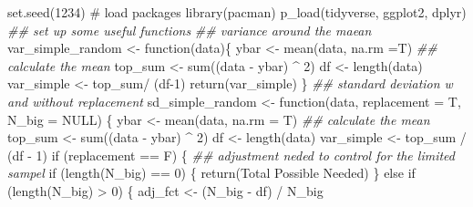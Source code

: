 \documentclass[
  letterpaper,
]{book}
\newenvironment{Shaded}{\begin{snugshade}}{\end{snugshade}}
\newcommand{\AttributeTok}[1]{\textcolor[rgb]{0.40,0.45,0.13}{#1}}
\newcommand{\CommentTok}[1]{\textcolor[rgb]{0.37,0.37,0.37}{#1}}
\newcommand{\ConstantTok}[1]{\textcolor[rgb]{0.56,0.35,0.01}{#1}}
\newcommand{\ControlFlowTok}[1]{\textcolor[rgb]{0.00,0.23,0.31}{#1}}
\newcommand{\DecValTok}[1]{\textcolor[rgb]{0.68,0.00,0.00}{#1}}
\newcommand{\DocumentationTok}[1]{\textcolor[rgb]{0.37,0.37,0.37}{\textit{#1}}}
\newcommand{\FunctionTok}[1]{\textcolor[rgb]{0.28,0.35,0.67}{#1}}
\newcommand{\NormalTok}[1]{\textcolor[rgb]{0.00,0.23,0.31}{#1}}
\newcommand{\OtherTok}[1]{\textcolor[rgb]{0.00,0.23,0.31}{#1}}
\newcommand{\SpecialCharTok}[1]{\textcolor[rgb]{0.37,0.37,0.37}{#1}}
\newcommand{\StringTok}[1]{\textcolor[rgb]{0.13,0.47,0.30}{#1}}
\begin{document}
\begin{Shaded}
\begin{Highlighting}[]
\FunctionTok{set.seed}\NormalTok{(}\DecValTok{1234}\NormalTok{)}
\CommentTok{\# load packages }
\FunctionTok{library}\NormalTok{(pacman)}
\FunctionTok{p\_load}\NormalTok{(tidyverse, ggplot2, dplyr)}
\DocumentationTok{\#\# set up some useful functions }
\DocumentationTok{\#\# variance around the maean }
\NormalTok{var\_simple\_random }\OtherTok{\textless{}{-}} \ControlFlowTok{function}\NormalTok{(data)\{}
\NormalTok{  ybar }\OtherTok{\textless{}{-}} \FunctionTok{mean}\NormalTok{(data, }\AttributeTok{na.rm =}\NormalTok{T) }\DocumentationTok{\#\# calculate the mean}
\NormalTok{  top\_sum }\OtherTok{\textless{}{-}} \FunctionTok{sum}\NormalTok{((data }\SpecialCharTok{{-}}\NormalTok{ ybar) }\SpecialCharTok{\^{}} \DecValTok{2}\NormalTok{)}
\NormalTok{  df }\OtherTok{\textless{}{-}} \FunctionTok{length}\NormalTok{(data)}
\NormalTok{  var\_simple }\OtherTok{\textless{}{-}}\NormalTok{ top\_sum}\SpecialCharTok{/}\NormalTok{ (df}\DecValTok{{-}1}\NormalTok{)}
  \FunctionTok{return}\NormalTok{(var\_simple)}
\NormalTok{\}}
\DocumentationTok{\#\# standard deviation w and without replacement }
\NormalTok{sd\_simple\_random }\OtherTok{\textless{}{-}} \ControlFlowTok{function}\NormalTok{(data, }\AttributeTok{replacement =}\NormalTok{ T, }\AttributeTok{N\_big =} \ConstantTok{NULL}\NormalTok{) \{}
\NormalTok{  ybar }\OtherTok{\textless{}{-}} \FunctionTok{mean}\NormalTok{(data, }\AttributeTok{na.rm =}\NormalTok{ T) }\DocumentationTok{\#\# calculate the mean}
\NormalTok{  top\_sum }\OtherTok{\textless{}{-}} \FunctionTok{sum}\NormalTok{((data }\SpecialCharTok{{-}}\NormalTok{ ybar) }\SpecialCharTok{\^{}} \DecValTok{2}\NormalTok{)}
\NormalTok{  df }\OtherTok{\textless{}{-}} \FunctionTok{length}\NormalTok{(data)}
\NormalTok{  var\_simple }\OtherTok{\textless{}{-}}\NormalTok{ top\_sum }\SpecialCharTok{/}\NormalTok{ (df }\SpecialCharTok{{-}} \DecValTok{1}\NormalTok{)}
  \ControlFlowTok{if}\NormalTok{ (replacement }\SpecialCharTok{==}\NormalTok{ F) \{}
    \DocumentationTok{\#\# adjustment neded to control for the limited sampel}
    \ControlFlowTok{if}\NormalTok{ (}\FunctionTok{length}\NormalTok{(N\_big) }\SpecialCharTok{==} \DecValTok{0}\NormalTok{) \{}
      \FunctionTok{return}\NormalTok{(}\StringTok{\textquotesingle{}Total Possible Needed\textquotesingle{}}\NormalTok{)}
\NormalTok{    \} }\ControlFlowTok{else} \ControlFlowTok{if}\NormalTok{ (}\FunctionTok{length}\NormalTok{(N\_big) }\SpecialCharTok{\textgreater{}} \DecValTok{0}\NormalTok{) \{}
\NormalTok{      adj\_fct }\OtherTok{\textless{}{-}}\NormalTok{ (N\_big }\SpecialCharTok{{-}}\NormalTok{ df) }\SpecialCharTok{/}\NormalTok{ N\_big}

\end{Highlighting}
\end{Shaded}
\end{document}
